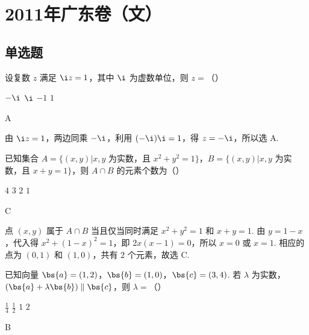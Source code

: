 \chapter{2011年广东卷（文）}

\section{单选题}

\begin{problem}
设复数 \(z\) 满足 \(\i z = 1\)，其中 \(\i\) 为虚数单位，则 \(z =\)（\quad）

\choices
    {\(-\i\)}
    {\(\i\)}
    {\(-1\)}
    {\(1\)}
\end{problem}

\begin{answer}
A
\end{answer}

\begin{solution}
由 \(\i z=1\)，两边同乘 \(-\i\)，利用 \((-\i)\i=1\)，得 \(z=-\i\)，所以选 A.
\end{solution}

\begin{problem}
已知集合 \(A = \{(x, y) | x, y\) 为实数，且 \(x^2 + y^2 = 1\}\)，\(B = \{(x, y) | x, y\) 为实数，且 \(x + y = 1\}\)，则 \(A \cap B\) 的元素个数为（\quad）

\choices
    {\(4\)}
    {\(3\)}
    {\(2\)}
    {\(1\)}
\end{problem}

\begin{answer}
C
\end{answer}

\begin{solution}
点 \((x,y)\) 属于 \(A\cap B\) 当且仅当同时满足 \(x^2+y^2=1\) 和 \(x+y=1\). 由 \(y=1-x\)，代入得 \(x^2+(1-x)^2=1\)，即 \(2x(x-1)=0\)，所以 \(x=0\) 或 \(x=1\). 相应的点为 \((0,1)\) 和 \((1,0)\)，共有 \(2\) 个元素，故选 C.
\end{solution}

\begin{problem}
已知向量 \(\bs{a} = (1, 2)\)，\(\bs{b} = (1, 0)\)，\(\bs{c} = (3, 4)\). 若 \(\lambda\) 为实数，\((\bs{a} + \lambda \bs{b}) \parallel \bs{c}\)，则 \(\lambda = \)（\quad）

\choices
    {\( \frac{1}{4} \)}
    {\( \frac{1}{2} \)}
    {\(1\)}
    {\(2\)}
\end{problem}

\begin{answer}
B
\end{answer}

